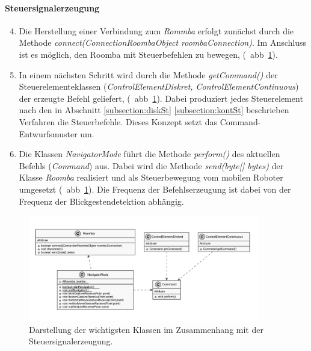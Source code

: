 \paragraph{Steuersignalerzeugung}
\begin{enumerate}
\setcounter{enumi}{3}
\item Die Herstellung einer Verbindung zum \textit{Rommba} erfolgt zunächst durch die Methode \textit{connect(ConnectionRoombaObject roombaConnection)}. Im Anschluss ist es möglich, den Roomba mit Steuerbefehlen zu bewegen, (\vgl~\acs{abb}~\ref{fig:navigationskontrolle}). 
\item In einem nächsten Schritt wird durch die Methode \textit{getCommand()} der Steuerelementeklassen  (\textit{ControlElementDiskret, ControlElementContinuous}) der erzeugte Befehl geliefert, (\vgl~\acs{abb}~\ref{fig:navigationskontrolle}). Dabei produziert jedes Steuerelement nach den in Abschnitt \ref{subsection:diskSt} \bzw \ref{subsection:kontSt} beschrieben Verfahren die Steuerbefehle. Dieses Konzept setzt das Command-Entwurfsmuster um. 
\item Die Klassen \textit{NavigatorMode} führt die Methode \textit{perform()} des aktuellen Befehls (\textit{Command}) aus. Dabei wird die Methode \textit{send(byte[] bytes)} der Klasse \textit{Roomba} realisiert und als Steuerbewegung vom mobilen Roboter umgesetzt (\vgl~\acs{abb}~\ref{fig:navigationskontrolle}). Die Frequenz der Befehlserzeugung ist dabei von der Frequenz der Blickgestendetektion abhängig. 
\end{enumerate}



\begin{figure}[ht]
\begin{center}
\includegraphics[width=0.9\textwidth]{bilder/uml/navigation.pdf}
\end{center}
\caption{Darstellung der wichtigsten Klassen im Zusammenhang mit der Steuersignalerzeugung.}
\label{fig:navigationskontrolle}
\end{figure}

